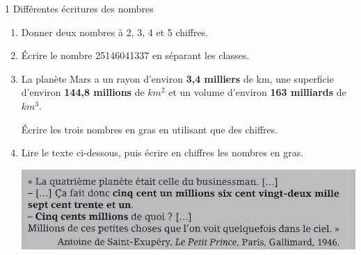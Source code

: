 \documentclass[12pt,a4paper]{article}
\date{}
\title{}
\begin{document}

\begin{myact}{1 Différentes écritures des nombres}
	
	\label{act:nbres}
	
	\begin{enumerate}
		\item Donner deux nombres à 2, 3, 4 et 5 chiffres.
		
		\item \'Ecrire  le nombre 25146041337 en séparant les classes.
		\item La planète Mars a un rayon d'environ \textbf{3,4 milliers} de km, une superficie d'environ \textbf{144,8 millions} de $km^2$ et un volume d'environ \textbf{163 milliards} de $km^3$.
		
		\'Ecrire les trois nombres en gras en utilisant que des chiffres.
		
		\item Lire le texte ci-dessous, puis écrire en chiffres les nombres en gras.
		
		\begin{center}
			\includegraphics[scale=1.1]{img/act1}
		\end{center}
	\end{enumerate}
\end{myact}

\vspace*{2cm}
\end{document}
